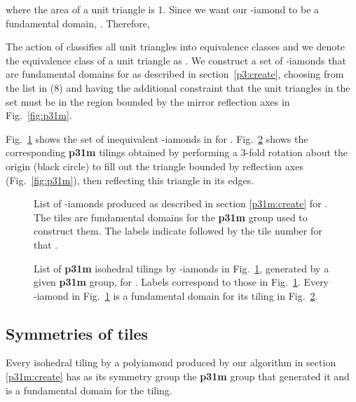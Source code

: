 \documentclass{ws-ijcga}
\begin{document}
where the area of a unit triangle is 1. 
Since we want our -iamond to be a fundamental domain, . 
Therefore,
  

The action of  classifies all unit triangles into  equivalence classes 
and we denote the equivalence class of a unit triangle  as . 
We construct a set  of -iamonds
that are
fundamental domains for  as described in section~\ref{p3:create}, 
choosing  from the list in (8) and
having the additional constraint that the unit triangles in the set  
must be in the region bounded by the mirror reflection axes in Fig.~\ref{fig:p31m}.

Fig.~\ref{p31mfighi} shows the set of inequivalent -iamonds in   for .  
Fig.~\ref{p31mtiling} shows the corresponding {\bf p31m} tilings obtained 
by performing a 3-fold rotation about the origin (black circle) to fill out 
the triangle bounded by reflection axes (Fig.~\ref{fig:p31m}), 
then reflecting this triangle in its edges.
\begin{figure}[h]
\centerline{
}
\vspace*{8pt}
\caption{
List of -iamonds produced as described in section \ref{p31m:create} for . 
The tiles are fundamental domains for the {\bf p31m} group used to construct them. 
The labels indicate  followed by the tile number for that . 
\label{p31mfighi}
}
\end{figure}
\begin{figure}\centerline{
}
\vspace*{8pt}
\caption{
List of {\bf p31m} isohedral tilings by -iamonds in Fig.~\ref{p31mfighi}, 
generated by a given {\bf p31m} group, for .
Labels correspond to those in Fig.~\ref{p31mfighi}. 
Every -iamond in Fig.~\ref{p31mfighi} is a fundamental domain for its tiling in Fig.~\ref{p31mtiling}.
\label{p31mtiling}
    }
\end{figure}




\subsection{Symmetries of tiles}

\begin{theorem}
Every isohedral tiling by a polyiamond  produced by our algorithm in section \ref{p31m:create}
has as its symmetry group the {\bf p31m} group that generated it and  is a fundamental domain for
the tiling.
\end{theorem}
\end{document}
